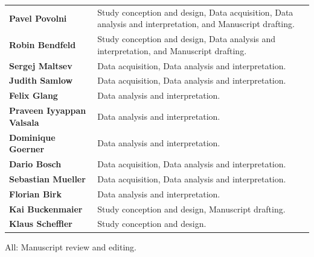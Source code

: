 \begin{enumerate}
	\begin{table}[h!]
		\centering
		\begin{tabularx}{\textwidth}{>{\bfseries}m{3.5cm} >{\arraybackslash}X}
			Pavel Povolni & Study conception and design, Data acquisition, Data analysis and interpretation, and Manuscript drafting. \\
			Robin Bendfeld & Study conception and design, Data analysis and interpretation, and Manuscript drafting. \\
			Sergej Maltsev & Data acquisition, Data analysis and interpretation. \\
			Judith Samlow & Data acquisition, Data analysis and interpretation. \\
			Felix Glang & Data analysis and interpretation. \\
			Praveen Iyyappan Valsala & Data analysis and interpretation. \\
			Dominique Goerner & Data analysis and interpretation. \\
			Dario Bosch & Data acquisition, Data analysis and interpretation. \\
			Sebastian Mueller & Data acquisition, Data analysis and interpretation. \\
			Florian Birk & Data analysis and interpretation. \\
			Kai Buckenmaier & Study conception and design, Manuscript drafting. \\
			Klaus Scheffler & Study conception and design. \\
		\end{tabularx}
	\end{table}
	
	All: Manuscript review and editing.
\end{enumerate}
